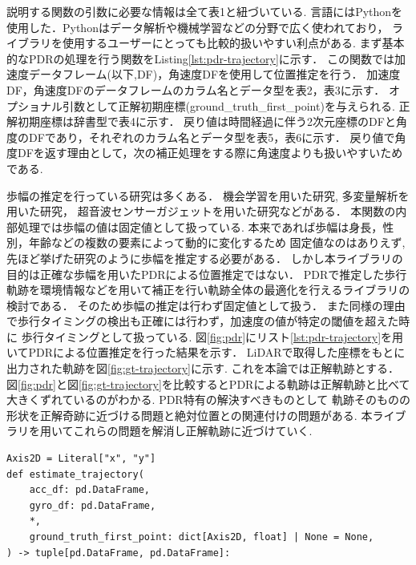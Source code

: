 説明する関数の引数に必要な情報は全て表1と紐づいている.
言語にはPythonを使用した．Pythonはデータ解析や機械学習などの分野で広く使われており，
ライブラリを使用するユーザーにとっても比較的扱いやすい利点がある.
まず基本的なPDRの処理を行う関数をListing\ref{lst:pdr-trajectory}に示す．
この関数では加速度データフレーム(以下,DF)，角速度DFを使用して位置推定を行う．
加速度DF，角速度DFのデータフレームのカラム名とデータ型を表2，表3に示す．
オプショナル引数として正解初期座標(ground\_truth\_first\_point)を与えられる.
正解初期座標は辞書型で表4に示す．
戻り値は時間経過に伴う2次元座標のDFと角度のDFであり，それぞれのカラム名とデータ型を表5，表6に示す．
戻り値で角度DFを返す理由として，次の補正処理をする際に角速度よりも扱いやすいためである.

歩幅の推定を行っている研究は多くある．
機会学習を用いた研究\cite{stride-length-auto-learning},
多変量解析を用いた研究\cite{stride-length-multi}，
超音波センサーガジェットを用いた研究\cite{stride-length-ultrasonic}などがある．
本関数の内部処理では歩幅の値は固定値として扱っている.
本来であれば歩幅は身長，性別，年齢などの複数の要素によって動的に変化するため
固定値なのはありえず,先ほど挙げた研究のように歩幅を推定する必要がある．
しかし本ライブラリの目的は正確な歩幅を用いたPDRによる位置推定ではない．
PDRで推定した歩行軌跡を環境情報などを用いて補正を行い軌跡全体の最適化を行えるライブラリの検討である．
そのため歩幅の推定は行わず固定値として扱う．
また同様の理由で歩行タイミングの検出も正確には行わず，加速度の値が特定の閾値を超えた時に
歩行タイミングとして扱っている.
図\ref{fig:pdr}にリスト\ref{lst:pdr-trajectory}を用いてPDRによる位置推定を行った結果を示す．
LiDARで取得した座標をもとに出力された軌跡を図\ref{fig:gt-trajectory}に示す.
これを本論では正解軌跡とする．
図\ref{fig:pdr}と図\ref*{fig:gt-trajectory}を比較するとPDRによる軌跡は正解軌跡と比べて大きくずれているのがわかる.
PDR特有の解決すべきものとして
軌跡そのものの形状を正解奇跡に近づける問題と絶対位置との関連付けの問題がある.
本ライブラリを用いてこれらの問題を解消し正解軌跡に近づけていく.

\begin{lstlisting}[caption={基本PDR}, label=lst:pdr-trajectory]
Axis2D = Literal["x", "y"]
def estimate_trajectory(
    acc_df: pd.DataFrame,
    gyro_df: pd.DataFrame,
    *,
    ground_truth_first_point: dict[Axis2D, float] | None = None,
) -> tuple[pd.DataFrame, pd.DataFrame]:
\end{lstlisting}


